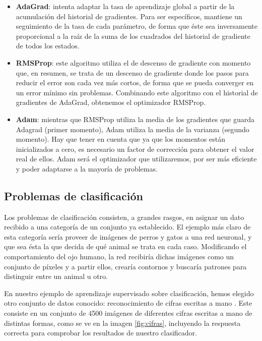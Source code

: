 \begin{itemize}
    \item \textbf{AdaGrad}: intenta adaptar la tasa de aprendizaje global a partir de la acumulación del historial de gradientes. Para ser específicos, mantiene un seguimiento de la tasa de cada parámetro, de forma que éste sea inversamente proporcional a la raíz de la suma de los cuadrados del historial de gradiente de todos los estados.
    \item \textbf{RMSProp}: este algoritmo utiliza el de descenso de gradiente con momento que, en resumen, se trata de un descenso de gradiente donde los pasos para reducir el error son cada vez más cortos, de forma que se pueda converger en un error mínimo sin problemas. Combinando este algoritmo con el historial de gradientes de AdaGrad, obtenemos el optimizador RMSProp. 
    \item \textbf{Adam}: mientras que RMSProp utiliza la media de los gradientes que guarda Adagrad (primer momento), Adam utiliza la media de la varianza (segundo momento). Hay que tener en cuenta que ya que los momentos están inicializados a cero, es necesario un factor de corrección para obtener el valor real de ellos. Adam será el optimizador que utilizaremos, por ser más eficiente y poder adaptarse a la mayoría de problemas.\citep[cap. 4]{Buduma:general}  
\end{itemize}

\subsection{Problemas de clasificación}
\label{sec:classif_NN}
Los problemas de clasificación consisten, a grandes rasgos, en asignar un dato recibido a una categoría de un conjunto ya establecido. El ejemplo más claro de esta categoría sería proveer de imágenes de perros y gatos a una red neuronal, y que sea ésta la que decida de qué animal se trata en cada caso. Modificando el comportamiento del ojo humano, la red recibiría dichas imágenes como un conjunto de píxeles y a partir ellos, crearía contornos y buscaría patrones para distinguir entre un animal u otro.

En nuestro ejemplo de aprendizaje supervisado sobre clasificación, hemos elegido otro conjunto de datos conocido: reconocimiento de cifras escritas a mano \citep{lecun-mnisthandwrittendigit-2010}. Este consiste en un conjunto de 4500 imágenes de diferentes cifras escritas a mano de distintas formas, como se ve en la imagen \ref{fig:cifras}, incluyendo la respuesta correcta para comprobar los resultados de nuestro clasificador.

